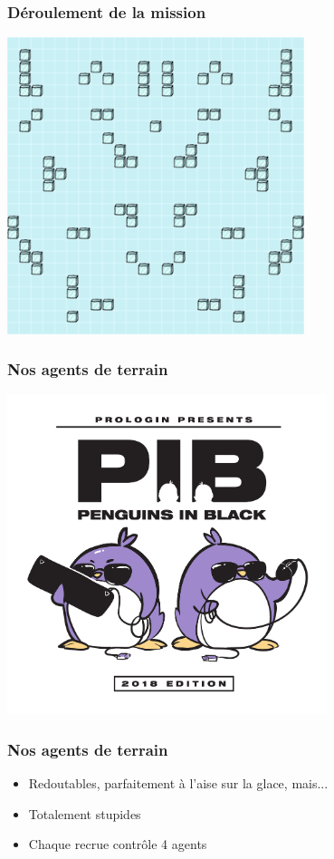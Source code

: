\documentclass{beamer}
\begin{document}
\begin{frame}
    \frametitle{Déroulement de la mission}
    \begin{center}
        \includegraphics[width=0.65\textwidth]{../img/map}
    \end{center}
\end{frame}

\begin{frame}
    \frametitle{Nos agents de terrain}
    \begin{center}
        \includegraphics[width=0.7\textwidth]{../logofinale_inv}
    \end{center}
\end{frame}

\begin{frame}
    \frametitle{Nos agents de terrain}
    \begin{itemize}[<+->]
        \item Redoutables, parfaitement à l'aise sur la glace, mais...
        \item Totalement stupides
        \item Chaque recrue contrôle 4 agents
    \end{itemize}
\end{frame}
\end{document}
